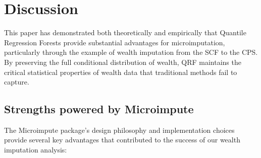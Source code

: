 \section{Discussion}

This paper has demonstrated both theoretically and empirically that Quantile Regression Forests provide substantial advantages for microimputation, particularly through the example of wealth imputation from the SCF to the CPS. By preserving the full conditional distribution of wealth, QRF maintains the critical statistical properties of wealth data that traditional methods fail to capture.

\subsection{Strengths powered by Microimpute}

The Microimpute package's design philosophy and implementation choices provide several key advantages that contributed to the success of our wealth imputation analysis:

